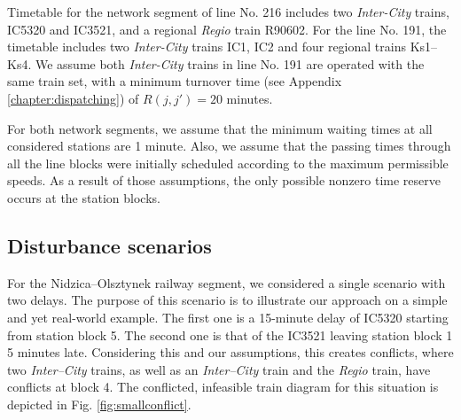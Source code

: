 Timetable for the network segment of line No. 216 includes two
\emph{Inter-City} trains, IC5320 and IC3521, and a regional \emph{Regio} train
R90602. For the line No. 191, the timetable includes two \emph{Inter-City}
trains IC1, IC2 and four regional trains Ks1--Ks4. We assume both
\emph{Inter-City} trains in line No. 191 are operated with the same train set,
with a minimum turnover time (see Appendix \ref{chapter:dispatching}) of $R(j,j') = 20$ minutes.

For both network segments, we assume that the minimum waiting times at all
considered stations are 1 minute. Also, we assume that the passing times
through all the line blocks were initially scheduled according to the maximum
permissible speeds. As a result of those assumptions, the only possible nonzero
time reserve occurs at the station blocks.

\subsection{Disturbance scenarios}

For the Nidzica--Olsztynek railway segment, we considered a single scenario
with two delays. The purpose of this scenario is to illustrate our approach on
a simple and yet real-world example. The first one is a 15-minute delay of
IC5320 starting from station block 5. The second one is that of the IC3521
leaving station block 1 5 minutes late. Considering this and our assumptions,
this creates conflicts, where two \emph{Inter--City} trains, as well as an
\emph{Inter--City} train and the \emph{Regio} train, have conflicts at block 4.
The conflicted, infeasible train diagram for this situation is depicted in Fig.
\ref{fig:smallconflict}.


